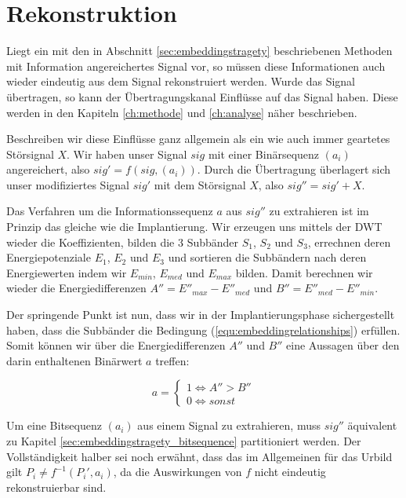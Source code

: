\section{Rekonstruktion}
\label{sec:reconstruction}

Liegt ein mit den in Abschnitt \ref{sec:embeddingstragety} beschriebenen Methoden mit Information angereichertes Signal vor, so müssen diese Informationen auch wieder eindeutig aus dem Signal rekonstruiert werden. Wurde das Signal übertragen, so kann der Übertragungskanal Einflüsse auf das Signal haben. Diese werden in den Kapiteln \ref{ch:methode} und \ref{ch:analyse} näher beschrieben. 

Beschreiben wir diese Einflüsse ganz allgemein als ein wie auch immer geartetes Störsignal $X$. Wir haben unser Signal $sig$ mit einer Binärsequenz $({a}_{i})$ angereichert, also $sig' = f( sig, ({a}_{i}))$. Durch die Übertragung überlagert sich unser modifiziertes Signal $sig'$ mit dem Störsignal $X$, also $sig'' = sig' + X$.

Das Verfahren um die Informationssequenz $a$ aus $sig''$ zu extrahieren ist im Prinzip das gleiche wie die Implantierung. Wir erzeugen uns mittels der DWT wieder die Koeffizienten, bilden die 3 Subbänder ${S}_{1}$, ${S}_{2}$ und ${S}_{3}$, errechnen deren Energiepotenziale ${E}_{1}$, ${E}_{2}$ und ${E}_{3}$ und sortieren die Subbändern nach deren Energiewerten indem wir ${E}_{min}$, ${E}_{med}$ und ${E}_{max}$ bilden. Damit berechnen wir wieder die Energiedifferenzen $A'' = {E''}_{max} - {E''}_{med}$ und $B'' = {E''}_{med} - {E''}_{min}$.

Der springende Punkt ist nun, dass wir in der Implantierungsphase sichergestellt haben, dass die Subbänder die Bedingung (\ref{equ:embeddingrelationships}) erfüllen. Somit können wir über die Energiedifferenzen $A''$ und $B''$ eine Aussagen über den darin enthaltenen Binärwert $a$ treffen:

	 \begin{equation}
		 a = \begin{cases}
    	 	1 \iff A'' > B''	 
			\\
    		0 \iff sonst
  		 \end{cases}
	 	\label{equ:extraction_bedingungen}
	 \end{equation}
	 
Um eine Bitsequenz $({a}_{i})$ aus einem Signal zu extrahieren, muss $sig''$ äquivalent zu Kapitel \ref{sec:embeddingstragety_bitsequence} partitioniert werden. Der Vollständigkeit halber sei noch erwähnt, dass das im Allgemeinen für das Urbild gilt ${P}_{i} \neq f^{-1}({P}_{i}', {a}_{i})$, da die Auswirkungen von $f$ nicht eindeutig rekonstruierbar sind. 

